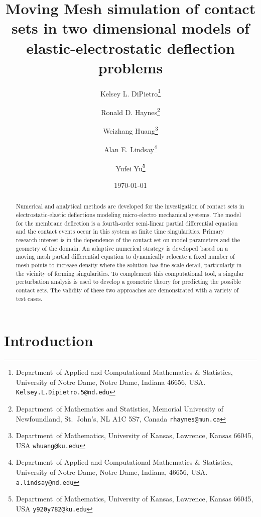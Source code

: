 \documentclass{siamart0516}
\title{Moving Mesh simulation of contact sets in two dimensional models of elastic-electrostatic deflection problems}
\date{\today}
\author{
Kelsey L. DiPietro\thanks{Department~of Applied and Computational Mathematics \& Statistics, University of Notre Dame, Notre Dame, Indiana 46656, USA. {\tt Kelsey.L.Dipietro.5@nd.edu}} \and
Ronald D. Haynes\thanks{Department~of Mathematics and Statistics, Memorial University of Newfoundland, St.~John's, NL A1C 5S7, Canada  {\tt rhaynes@mun.ca}} \and
Weizhang Huang\thanks{Department~of Mathematics, University of Kansas, Lawrence, Kansas 66045, USA {\tt whuang@ku.edu}} \and
Alan E. Lindsay\thanks{Department~of Applied and Computational Mathematics \& Statistics, University of Notre Dame, Notre Dame, Indiana, 46656, USA. {\tt a.lindsay@nd.edu}} \and
Yufei Yu\thanks{Department~of Mathematics, University of Kansas, Lawrence, Kansas 66045, USA {\tt y920y782@ku.edu}}
}
\theoremstyle{plain}%
\theoremstyle{definition}
\theoremstyle{remark}
\begin{document}
\baselineskip=16pt

\maketitle

\begin{abstract}
Numerical and analytical methods are developed for the investigation of contact sets in electrostatic-elastic deflections modeling micro-electro mechanical systems. The model for the membrane deflection is a fourth-order semi-linear partial differential equation and the contact events occur in this system as finite time singularities. Primary research interest is in the dependence of the contact set on model parameters and the geometry of the domain. An adaptive numerical strategy is developed based on a moving mesh partial differential equation to dynamically relocate a fixed number of mesh points to increase density where the solution has fine scale detail, particularly in the vicinity of forming singularities. To complement this computational tool, a singular perturbation analysis is used to develop a geometric theory for predicting the possible contact sets. The validity of these two approaches are demonstrated with a variety of test cases.
\end{abstract}

\section{Introduction}\label{sec:introduction}
\end{document}
